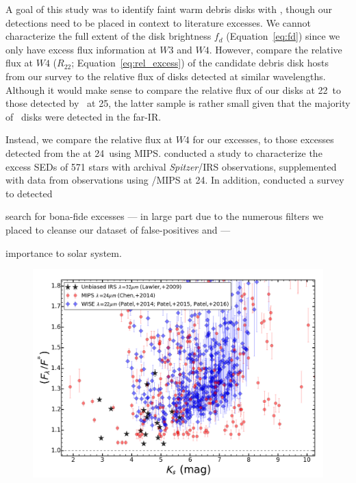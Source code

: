     A goal of this study was to identify faint warm debris disks with \WS, though our detections need to be placed in context to literature excesses. We cannot characterize the full extent of the disk brightness $f_d$ (Equation~\ref{eq:fd}) since we only have excess flux information at $W3$ and $W4$. However, compare the relative flux at $W4$ ($R_{22}$; Equation~\ref{eq:rel_excess}) of the candidate debris disk hosts from our survey to the relative flux of disks detected at similar wavelengths. Although it would make sense to compare the relative flux of our disks at 22\micron\ to those detected by \iras\ at 25\micron, the latter sample is rather small given that the majority of \iras\ disks were detected in the far-IR. 
    
    Instead, we compare the relative flux at $W4$ for our excesses, to those excesses detected from the \spitzer at 24\micron\ using MIPS. \citet{Chen2014} conducted a study to characterize the excess SEDs of 571 stars with archival \textit{Spitzer}/IRS observations, supplemented with data from observations using \spitzer/MIPS at 24\micron. In addition, \citet{Lawler2009} conducted a survey to detected
    
    
    
     search for bona-fide excesses --- in large part due to the numerous filters we placed to cleanse our dataset of false-positives and  --- 

    importance to solar system.


    \begin{figure}
    \centering
    \includegraphics[width=\textwidth]{Ch5/relflux_wise_mips_irs_120pc}
    \caption[WISE Disk Sensitivity]{}
    \label{fig:wise_relflux}
    \end{figure}




